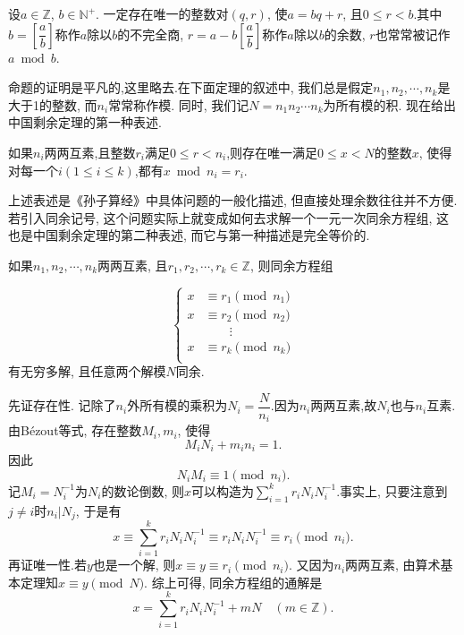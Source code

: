 \documentclass[color=green,mathpazo,titlestyle=hang]{elegantbook}
\begin{document}
  
\begin{newprop}[带余除法]
  设$a\in \mathbb{Z}$, $b\in \mathbb{N^+}$.	一定存在唯一的整数对$(q,r)$, 使$a=bq+r$, 且$0\leq r< b$.其中$b=\left[\dfrac{a}{b}\right]$称作$a$除以$b$的不完全商, $r=a-b\left[\dfrac{a}{b}\right]$称作$a$除以$b$的余数, $r$也常常被记作$a\bmod b$.
\end{newprop} 


\newpage

  命题的证明是平凡的,这里略去.在下面定理的叙述中, 我们总是假定$n_1,n_2,\cdots,n_k$是大于1的整数, 而$n_i$常常称作模. 同时, 我们记$N=n_1n_2\cdots n_k$为所有模的积. 现在给出中国剩余定理的第一种表述.
  
  
  \begin{newthem}[中国剩余定理I]
  	如果$n_i$两两互素,且整数$r_i$满足$0\leq r< n_i$,则存在唯一满足$0\leq x <N$的整数$x$, 使得对每一个$i(1\leq i \leq k)$,都有$x\bmod n_i=r_i$.
  \end{newthem}

  上述表述是《孙子算经》中具体问题的一般化描述, 但直接处理余数往往并不方便. 若引入同余记号, 这个问题实际上就变成如何去求解一个一元一次同余方程组, 这也是中国剩余定理的第二种表述, 而它与第一种描述是完全等价的.
  
  \begin{newthem}[中国剩余定理II]
  	如果$n_1,n_2,\cdots,n_k$两两互素, 且$r_1,r_2,\cdots,r_k \in \mathbb{Z}$, 则同余方程组
  
  	\begin{equation*}
  	\left\{                          
  	\begin{aligned}
  	x&\equiv r_1\pmod{n_1}\\
  	x&\equiv r_2\pmod{n_2}\\
  	 &\qquad \vdots\\ 
  	x&\equiv r_k\pmod{n_k}\\
  	\end{aligned}
  	\right.
  	\end{equation*}
  有无穷多解, 且任意两个解模$N$同余.	
  
  \end{newthem}


  \begin{newproof}
	先证存在性. 记除了$n_i$外所有模的乘积为$N_i=\dfrac{N}{n_i}$.因为$n_i$两两互素,故$N_i$也与$n_i$互素.由B\'{e}zout等式, 存在整数$M_i,m_i$, 使得
	\[
	M_iN_i+m_in_i=1.
	\]
	因此
	\[
	N_iM_i\equiv 1\pmod{n_i}.
	\]
	记$M_i=N_i^{-1}$为$N_i$的数论倒数, 则$x$可以构造为$\sum\limits_{i=1}^{k}r_iN_i N_i^{-1}$.事实上, 只要注意到$j\ne i$时$n_i|N_j$, 于是有
	\[
	x\equiv \sum_{i=1}^{k}r_iN_{i} N_i^{-1}\equiv r_iN_i N_i^{-1}\equiv r_i\pmod{n_i}.
	\]
	再证唯一性.若$y$也是一个解, 则$x\equiv y\equiv r_i\pmod{n_i}$. 又因为$n_i$两两互素, 由算术基本定理知$x\equiv y\pmod{N}$.
	综上可得, 同余方程组的通解是
	\begin{equation}
		x=\sum_{i=1}^{k}r_iN_i N_i^{-1}+mN \quad (m\in\mathbb{Z}).
	\end{equation}
  \end{newproof}
\end{document}
